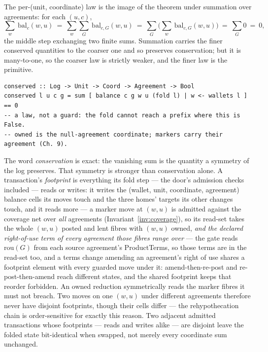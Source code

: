 \documentclass[11pt,a4paper]{article}
\begin{document}
The per-(unit, coordinate) law is the image of the theorem under summation over agreements:
for each $(u,c)$,
\[
\sum_{w}\ \mathrm{bal}_c(w,u)\ =\ \sum_{w}\sum_{G}\ \mathrm{bal}_{c,G}(w,u)\ =\ \sum_{G}\Big(\sum_{w}\ \mathrm{bal}_{c,G}(w,u)\Big)\ =\ \sum_{G} 0\ =\ 0,
\]
the middle step exchanging two finite sums. Summation carries the finer conserved
quantities to the coarser one and so preserves conservation; but it is many-to-one, so the
coarser law is strictly weaker, and the finer law is the primitive.

\begin{lstlisting}
conserved :: Log -> Unit -> Coord -> Agreement -> Bool
conserved l u c g = sum [ balance c g w u (fold l) | w <- wallets l ] == 0
-- a law, not a guard: the fold cannot reach a prefix where this is False.
-- owned is the null-agreement coordinate; markers carry their agreement (Ch. 9).
\end{lstlisting}

The word \emph{conservation} is exact: the vanishing sum is the quantity a
symmetry of the log preserves. That symmetry is stronger than conservation alone. A
transaction's \emph{footprint} is everything its fold step --- the door's admission
checks included --- reads or writes: it writes the (wallet, unit, coordinate, agreement)
balance cells its moves touch and the three homes' targets its other changes touch, and
it reads more --- a marker move at $(w,u)$ is admitted against the coverage net over
\emph{all} agreements (Invariant~\ref{inv:coverage}), so its read-set takes the whole
$(w,u)$ posted and lent fibres with $(w,u)$ owned, \emph{and the declared right-of-use
term of every agreement those fibres range over} --- the gate reads $\mathrm{rou}(G)$
from each source agreement's ProductTerms, so those terms are in the read-set too, and a
terms change amending an agreement's right of use shares a footprint element with every
guarded move under it: amend-then-re-post and re-post-then-amend reach different states,
and the shared footprint keeps that reorder forbidden. An owned reduction symmetrically
reads the marker fibres it must not breach. Two moves on one $(w,u)$ under different
agreements therefore never have disjoint footprints, though their cells differ --- the
rehypothecation chain is order-sensitive for exactly this reason. Two adjacent admitted
transactions whose footprints --- reads and writes alike --- are disjoint leave the
folded state bit-identical when swapped, not merely every coordinate sum unchanged.
\end{document}
